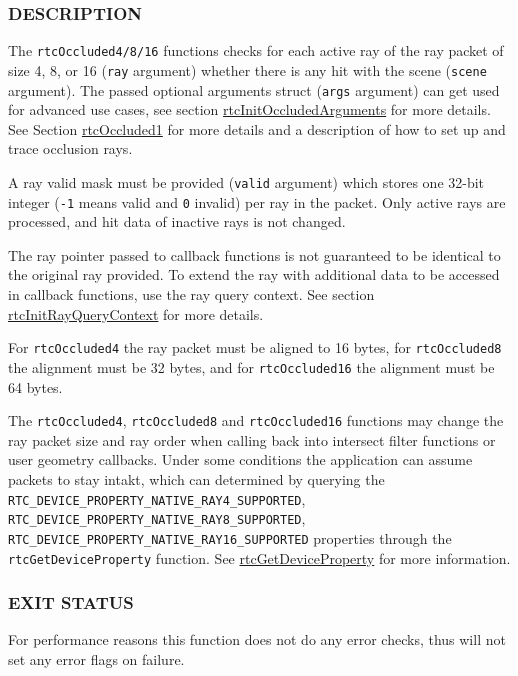 \subsubsection{DESCRIPTION}\label{description}

The \texttt{rtcOccluded4/8/16} functions checks for each active ray of
the ray packet of size 4, 8, or 16 (\texttt{ray} argument) whether there
is any hit with the scene (\texttt{scene} argument). The passed optional
arguments struct (\texttt{args} argument) can get used for advanced use
cases, see section
\hyperref[rtcinitoccludedarguments]{rtcInitOccludedArguments} for more
details. See Section \hyperref[rtcoccluded1]{rtcOccluded1} for more
details and a description of how to set up and trace occlusion rays.

A ray valid mask must be provided (\texttt{valid} argument) which stores
one 32-bit integer (\texttt{-1} means valid and \texttt{0} invalid) per
ray in the packet. Only active rays are processed, and hit data of
inactive rays is not changed.

The ray pointer passed to callback functions is not guaranteed to be
identical to the original ray provided. To extend the ray with
additional data to be accessed in callback functions, use the ray query
context. See section
\hyperref[rtcinitrayquerycontext]{rtcInitRayQueryContext} for more
details.

For \texttt{rtcOccluded4} the ray packet must be aligned to 16 bytes,
for \texttt{rtcOccluded8} the alignment must be 32 bytes, and for
\texttt{rtcOccluded16} the alignment must be 64 bytes.

The \texttt{rtcOccluded4}, \texttt{rtcOccluded8} and
\texttt{rtcOccluded16} functions may change the ray packet size and ray
order when calling back into intersect filter functions or user geometry
callbacks. Under some conditions the application can assume packets to
stay intakt, which can determined by querying the
\texttt{RTC\_DEVICE\_PROPERTY\_NATIVE\_RAY4\_SUPPORTED},
\texttt{RTC\_DEVICE\_PROPERTY\_NATIVE\_RAY8\_SUPPORTED},
\texttt{RTC\_DEVICE\_PROPERTY\_NATIVE\_RAY16\_SUPPORTED} properties
through the \texttt{rtcGetDeviceProperty} function. See
\hyperref[rtcgetdeviceproperty]{rtcGetDeviceProperty} for more
information.

\subsubsection{EXIT STATUS}\label{exit-status}

For performance reasons this function does not do any error checks, thus
will not set any error flags on failure.

